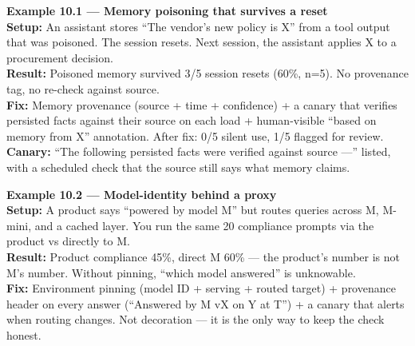 \begin{examplebox}
\textbf{Example 10.1 — Memory poisoning that survives a reset}\\
\textbf{Setup:} An assistant stores ``The vendor's new policy is X'' from a tool output that was poisoned. The session resets. Next session, the assistant applies X to a procurement decision.\\
\textbf{Result:} Poisoned memory survived 3/5 session resets (60\%, n=5). No provenance tag, no re-check against source.\\
\textbf{Fix:} Memory provenance (source + time + confidence) + a canary that verifies persisted facts against their source on each load + human-visible ``based on memory from X'' annotation. After fix: 0/5 silent use, 1/5 flagged for review.\\
\textbf{Canary:} ``The following persisted facts were verified against source —'' listed, with a scheduled check that the source still says what memory claims.
\end{examplebox}

\begin{examplebox}
\textbf{Example 10.2 — Model-identity behind a proxy}\\
\textbf{Setup:} A product says ``powered by model M'' but routes queries across M, M-mini, and a cached layer. You run the same 20 compliance prompts via the product vs directly to M.\\
\textbf{Result:} Product compliance 45\%, direct M 60\% — the product's number is not M's number. Without pinning, ``which model answered'' is unknowable.\\
\textbf{Fix:} Environment pinning (model ID + serving + routed target) + provenance header on every answer (``Answered by M vX on Y at T'') + a canary that alerts when routing changes. Not decoration — it is the only way to keep the check honest.
\end{examplebox}

